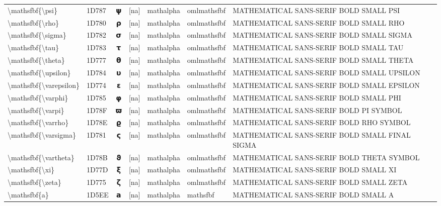 \documentclass[a4paper,landscape]{article}
\begin{document}
\begin{longtable}{llcclll}
\textbackslash{}mathsfbf\{\textbackslash{}psi\} & 1D787 & 𝞇 & [na] & mathalpha & omlmathsfbf & MATHEMATICAL SANS-SERIF BOLD SMALL PSI \\
\textbackslash{}mathsfbf\{\textbackslash{}rho\} & 1D780 & 𝞀 & [na] & mathalpha & omlmathsfbf & MATHEMATICAL SANS-SERIF BOLD SMALL RHO \\
\textbackslash{}mathsfbf\{\textbackslash{}sigma\} & 1D782 & 𝞂 & [na] & mathalpha & omlmathsfbf & MATHEMATICAL SANS-SERIF BOLD SMALL SIGMA \\
\textbackslash{}mathsfbf\{\textbackslash{}tau\} & 1D783 & 𝞃 & [na] & mathalpha & omlmathsfbf & MATHEMATICAL SANS-SERIF BOLD SMALL TAU \\
\textbackslash{}mathsfbf\{\textbackslash{}theta\} & 1D777 & 𝝷 & [na] & mathalpha & omlmathsfbf & MATHEMATICAL SANS-SERIF BOLD SMALL THETA \\
\textbackslash{}mathsfbf\{\textbackslash{}upsilon\} & 1D784 & 𝞄 & [na] & mathalpha & omlmathsfbf & MATHEMATICAL SANS-SERIF BOLD SMALL UPSILON \\
\textbackslash{}mathsfbf\{\textbackslash{}varepsilon\} & 1D774 & 𝝴 & [na] & mathalpha & omlmathsfbf & MATHEMATICAL SANS-SERIF BOLD SMALL EPSILON \\
\textbackslash{}mathsfbf\{\textbackslash{}varphi\} & 1D785 & 𝞅 & [na] & mathalpha & omlmathsfbf & MATHEMATICAL SANS-SERIF BOLD SMALL PHI \\
\textbackslash{}mathsfbf\{\textbackslash{}varpi\} & 1D78F & 𝞏 & [na] & mathalpha & omlmathsfbf & MATHEMATICAL SANS-SERIF BOLD PI SYMBOL \\
\textbackslash{}mathsfbf\{\textbackslash{}varrho\} & 1D78E & 𝞎 & [na] & mathalpha & omlmathsfbf & MATHEMATICAL SANS-SERIF BOLD RHO SYMBOL \\
\textbackslash{}mathsfbf\{\textbackslash{}varsigma\} & 1D781 & 𝞁 & [na] & mathalpha & omlmathsfbf & MATHEMATICAL SANS-SERIF BOLD SMALL FINAL SIGMA \\
\textbackslash{}mathsfbf\{\textbackslash{}vartheta\} & 1D78B & 𝞋 & [na] & mathalpha & omlmathsfbf & MATHEMATICAL SANS-SERIF BOLD THETA SYMBOL \\
\textbackslash{}mathsfbf\{\textbackslash{}xi\} & 1D77D & 𝝽 & [na] & mathalpha & omlmathsfbf & MATHEMATICAL SANS-SERIF BOLD SMALL XI \\
\textbackslash{}mathsfbf\{\textbackslash{}zeta\} & 1D775 & 𝝵 & [na] & mathalpha & omlmathsfbf & MATHEMATICAL SANS-SERIF BOLD SMALL ZETA \\
\textbackslash{}mathsfbf\{a\} & 1D5EE & 𝗮 & [na] & mathalpha & mathsfbf & MATHEMATICAL SANS-SERIF BOLD SMALL A \\

\end{longtable}
\end{document}
